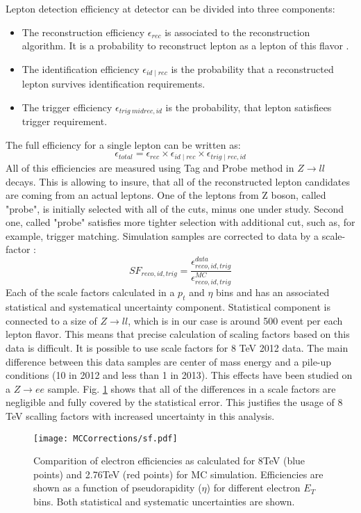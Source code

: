 Lepton detection efficiency at \atlas detector can be divided into three components:
\begin{itemize}
\item The reconstruction efficiency $\epsilon_{rec}$ is associated to the reconstruction algorithm. It is a probability to reconstruct lepton as a lepton of this flavor .
\item The identification efficiency $\epsilon_{id \mid rec}$ is the probability that a reconstructed lepton survives  identification requirements. 
\item The trigger efficiency $\epsilon_{trig \ mid rec,id}$ is the probability, that lepton satisfiees trigger requirement. 
\end{itemize}
The full efficiency for a single lepton can be written as:
\begin{equation}
\epsilon_{total}=\epsilon_{rec} \times \epsilon_{id \mid rec} \times \epsilon_{trig \mid rec,id}
\end{equation}
All of this efficiencies are measured using Tag and Probe method in $Z\to ll$ decays. This is allowing to insure, that all of the reconstructed lepton candidates are coming from an actual leptons. One of the leptons from Z boson, called "probe", is initially selected with all of the cuts, minus one under study. Second one, called "probe" satisfies more tighter selection with additional cut, such as, for example, trigger matching. 
Simulation samples are corrected to data by a scale-factor :
\begin{equation}
SF_{reco,id,trig}=\frac{\epsilon^{data}_{reco,id,trig}}{\epsilon^{MC}_{reco,id,trig}}
\end{equation}
Each of the scale factors calculated in a $p_{t}$ and $\eta$ bins and has an associated statistical and systematical uncertainty component. Statistical component is connected to a size of $Z\to ll$, which is in our case is around 500 event per each lepton flavor. This means that precise calculation of scaling factors based on this data is difficult.
It is possible to use scale factors for 8 TeV 2012 data. The main difference between this data samples are center of mass energy and a pile-up conditions (10 in 2012 and less than 1 in 2013). This effects have been studied on a $Z\to ee$ sample. Fig. \ref{eff_comp} shows that all of the differences in a scale factors are negligible and fully covered by the statistical error. This justifies the usage of 8 TeV scalling factors with increased uncertainty in this analysis. 

\begin{figure}
\centering
\texttt{[image: MCCorrections/sf.pdf]}
\caption{Comparition of electron efficiencies as calculated for 8TeV (blue points) and 2.76TeV (red points) for MC simulation. Efficiencies are shown as a function of pseudorapidity ($\eta$) for different electron $E_T$ bins. Both statistical and systematic uncertainties are shown.    \label{eff_comp}}
\end{figure}

